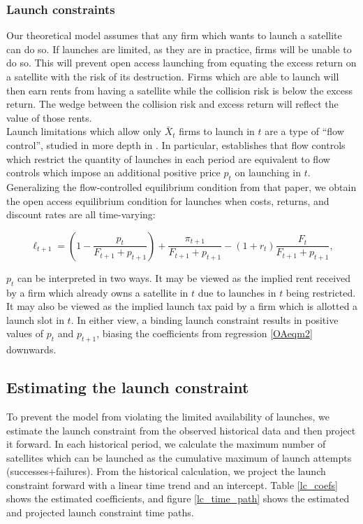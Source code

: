 \documentclass[12pt]{article}
\begin{document}
\subsubsection{Launch constraints}

Our theoretical model assumes that any firm which wants to launch a satellite can do so. If launches are limited, as they are in practice, firms will be unable to do so. This will prevent open access launching from equating the excess return on a satellite with the risk of its destruction. Firms which are able to launch will then earn rents from having a satellite while the collision risk is below the excess return. The wedge between the collision risk and excess return will reflect the value of those rents. \\

Launch limitations which allow only $\bar{X}_t$ firms to launch in $t$ are a type of ``flow control'', studied in more depth in \citet{raoJMP}. In particular, \citet{raoJMP} establishes that flow controls which restrict the quantity of launches in each period are equivalent to flow controls which impose an additional positive price $p_t$ on launching in $t$. Generalizing the flow-controlled equilibrium condition from that paper, we obtain the open access equilibrium condition for launches when costs, returns, and discount rates are all time-varying:

\begin{equation}
\label{OAfloweqmcond}
\ell_{t+1} = (1 - \frac{p_t}{F_{t+1} + p_{t+1}}) + \frac{\pi_{t+1}}{F_{t+1} + p_{t+1}} - (1+r_t)\frac{F_t}{F_{t+1} + p_{t+1}},
\end{equation}

$p_t$ can be interpreted in two ways. It may be viewed as the implied rent received by a firm which already owns a satellite in $t$ due to launches in $t$ being restricted. It may also be viewed as the implied launch tax paid by a firm which is allotted a launch slot in $t$. In either view, a binding launch constraint results in positive values of $p_t$ and $p_{t+1}$, biasing the coefficients from regression \ref{OAeqm2} downwards. %

\subsection{Estimating the launch constraint}
\label{launch_constraint}

To prevent the model from violating the limited availability of launches, we estimate the launch constraint from the observed historical data and then project it forward. In each historical period, we calculate the maximum number of satellites which can be launched as the cumulative maximum of launch attempts (successes+failures). From the historical calculation, we project the launch constraint forward with a linear time trend and an intercept. Table \ref{lc_coefs} shows the estimated coefficients, and figure \ref{lc_time_path} shows the estimated and projected launch constraint time paths.
\end{document}
